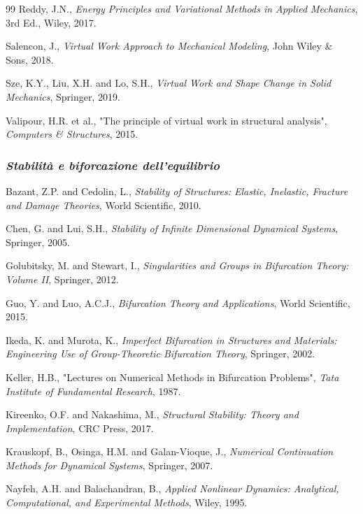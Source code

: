 \begin{thebibliography}{99}
Reddy, J.N., {\em Energy Principles and Variational Methods in Applied Mechanics}, 3rd Ed., Wiley, 2017.

Salencon, J., {\em Virtual Work Approach to Mechanical Modeling}, John Wiley \& Sons, 2018.

Sze, K.Y., Liu, X.H. and Lo, S.H., {\em Virtual Work and Shape Change in Solid Mechanics}, Springer, 2019.

Valipour, H.R. et al., "The principle of virtual work in structural analysis", {\em Computers \& Structures}, 2015.



\vspace{0.6 cm}
\subsubsection{\emph{Stabilità e biforcazione dell'equilibrio }}

Bazant, Z.P. and Cedolin, L., {\em Stability of Structures: Elastic, Inelastic, Fracture and Damage Theories}, World Scientific, 2010.

Chen, G. and Lui, S.H., {\em Stability of Infinite Dimensional Dynamical Systems}, Springer, 2005.

Golubitsky, M. and Stewart, I., {\em Singularities and Groups in Bifurcation Theory: Volume II}, Springer, 2012.

Guo, Y. and Luo, A.C.J., {\em Bifurcation Theory and Applications}, World Scientific, 2015.

Ikeda, K. and Murota, K., {\em Imperfect Bifurcation in Structures and Materials: Engineering Use of Group-Theoretic Bifurcation Theory}, Springer, 2002.

Keller, H.B., "Lectures on Numerical Methods in Bifurcation Problems", {\em Tata Institute of Fundamental Research}, 1987.

Kireenko, O.F. and Nakashima, M., {\em Structural Stability: Theory and Implementation}, CRC Press, 2017.

Krauskopf, B., Osinga, H.M. and Galan-Vioque, J., {\em Numerical Continuation Methods for Dynamical Systems}, Springer, 2007.

Nayfeh, A.H. and Balachandran, B., {\em Applied Nonlinear Dynamics: Analytical, Computational, and Experimental Methods}, Wiley, 1995.


\end{thebibliography}
